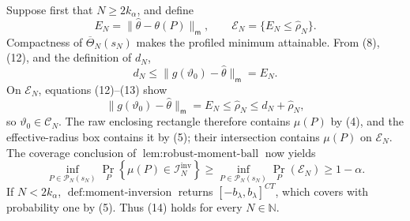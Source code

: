 Suppose first that \(N\geq2k_\alpha\), and define
\[
 E_N=\|\widehat\theta-\theta(P)\|_{\mathsf m},
 \qquad
 \mathcal E_N=\{E_N\leq\widehat\rho_N\}.
\]
Compactness of \(\overline\Theta_N(s_N)\) makes the profiled minimum attainable.  From (8), (12), and the definition of \(d_N\),
\[
 d_N\leq\|g(\vartheta_0)-\widehat\theta\|_{\mathsf m}=E_N.
 \tag{13}
\]
On \(\mathcal E_N\), equations (12)--(13) show
\[
 \|g(\vartheta_0)-\widehat\theta\|_{\mathsf m}
 =E_N\leq\widehat\rho_N\leq d_N+\widehat\rho_N,
\]
so \(\vartheta_0\in\mathcal C_N\).  The raw enclosing rectangle therefore contains \(\mu(P)\) by (4), and the effective-radius box contains it by (5); their intersection contains \(\mu(P)\) on \(\mathcal E_N\).  The coverage conclusion of \(\operatorname{lem:robust\text{-}moment\text{-}ball}\) now yields
\[
 \inf_{P\in\mathcal P_N(s_N)}
 \Pr_P\!\left\{\mu(P)\in\mathcal I_N^{\mathrm{inv}}\right\}
 \geq
 \inf_{P\in\mathcal P_N(s_N)}\Pr_P(\mathcal E_N)
 \geq1-\alpha.
 \tag{14}
\]
If \(N<2k_\alpha\), \(\operatorname{def:moment\text{-}inversion}\) returns \([-b_\lambda,b_\lambda]^{CT}\), which covers with probability one by (5).  Thus (14) holds for every \(N\in\mathbb N\).

